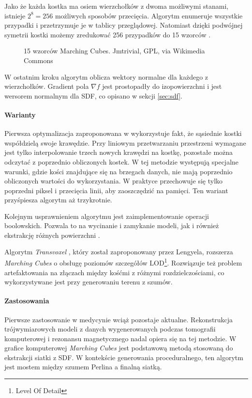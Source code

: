 Jako że każda kostka ma osiem wierzchołków z dwoma możliwymi stanami, istnieje $2^8 = 256$ możliwych sposobów przecięcia. Algorytm enumeruje wszystkie przypadki i przetrzymuje je w tablicy przeglądowej. Natomiast dzięki podwójnej symetrii kostki możemy zredukować 256 przypadków do 15 wzorców \cite{lorensen1987}.

\begin{figure}[h!]
    \centering
    
    \caption{15 wzorców Marching Cubes. Jmtrivial, GPL, via Wikimedia Commons}
    
\end{figure}

W ostatnim kroku algorytm oblicza wektory normalne dla każdego z wierzchołków. Gradient pola $\nabla f$ jest prostopadły do izopowierzchni i jest wersorem normalnym dla SDF, co opisano w sekcji \ref{sec:sdf}.

\paragraph{Warianty}
Pierwsza optymalizacja zaproponowana w \cite{lorensen1987} wykorzystuje fakt, że sąsiednie kostki współdzielą swoje krawędzie. Przy liniowym przetwarzaniu przestrzeni wymagane jest tylko interpolowanie trzech nowych krawędzi na kostkę, pozostałe można odczytać z poprzednio obliczonych kostek. W tej metodzie występują specjalne warunki, gdzie kości znajdujące się na brzegach danych, nie mają poprzednio obliczonych wartości do wykorzystania. W praktyce przechowuje się tylko poprzedni piksel i przecięcia linii, aby zaoszczędzić na pamięci. Ten wariant przyśpiesza algorytm aż trzykrotnie.

Kolejnym usprawnieniem algorytmu jest zaimplementowanie operacji boolowskich. Pozwala to na wycinanie i zamykanie modeli, jak i również ekstrakcję różnych powierzchni \cite{lorensen1987}.

Algorytm \textit{Transvoxel} \cite{lengyel2010}, który został zaproponowany przez Lengyela, rozszerza \textit{Marching Cubes} o obsługę poziomów szczegółów LOD\footnote{Level Of Detail}. Rozwiązuje też problem artefaktowania na złączach między kośćmi z różnymi rozdzielczościami, co wykorzystywane jest przy generowaniu terenu z szumów.

\paragraph{Zastosowania}
Pierwsze zastosowanie w medycynie wciąż pozostaje aktualne. Rekonstrukcja trójwymiarowych modeli z danych wygenerowanych podczas tomografii komputerowej i rezonansu magnetycznego nadal opiera się na tej metodzie. W grafice komputerowej \textit{Marching Cubes} jest podstawową metodą stosowaną do ekstrakcji siatki z SDF. W kontekście generowania proceduralnego, ten algorytm jest mostem między szumem Perlina a finalną siatką.

